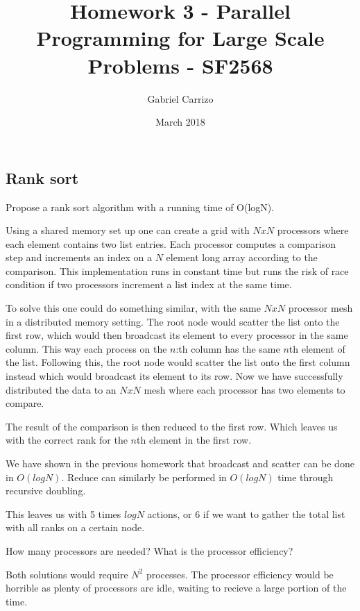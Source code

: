 \documentclass[a4paper]{exam}
\title{Homework 3 - Parallel Programming for Large Scale Problems - SF2568}
\author{Gabriel Carrizo}
\date{March 2018}
\begin{document}
\maketitle

\pagebreak
\begin{questions}

\section{Rank sort}


\addpoints \question Propose a rank sort algorithm with a running time of O(logN).

\begin{solution}
  Using a shared memory set up one can create a grid with $NxN$ processors where each element contains two list entries. Each processor computes a comparison step and increments an index on a $N$ element long array according to the comparison. This implementation runs in constant time but runs the risk of race condition if two processors increment a list index at the same time.

  To solve this one could do something similar, with the same $NxN$ processor mesh in a distributed memory setting. The root node would scatter the list onto the first row, which would then broadcast its element to every processor in the same column. This way each process on the $n$:th column has the same $n$th element of the list. Following this, the root node would scatter the list onto the first column instead which would broadcast its element to its row. Now we have successfully distributed the data to an $NxN$ mesh where each processor has two elements to compare.

  The result of the comparison is then reduced to the first row. Which leaves us with the correct rank for the $n$th element in the first row.

  We have shown in the previous homework that broadcast and scatter can be done in $O(log N)$. Reduce can similarly be performed in $O(log N)$ time through recursive doubling.

  This leaves us with 5 times $log N$ actions, or 6 if we want to gather the total list with all ranks on a certain node.

\end{solution}

\addpoints \question How many processors are needed? What is the processor efficiency?

\begin{solution}
  Both solutions would require $N^2$ processes. The processor efficiency would be horrible as plenty of processors are idle, waiting to recieve a large portion of the time.


\end{solution}
\end{questions}
\end{document}
